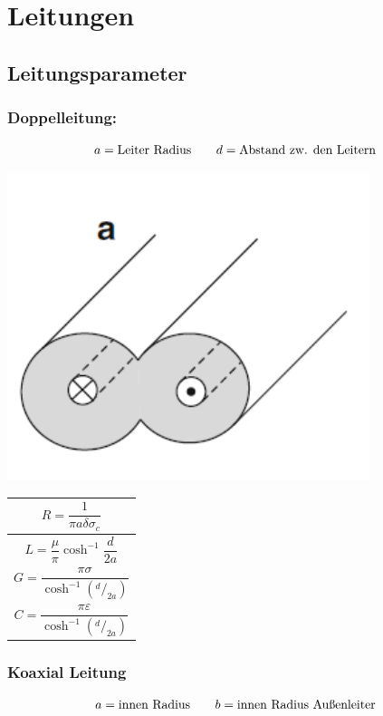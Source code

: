 \section{Leitungen}

\subsection{Leitungsparameter}

\subsubsection{Doppelleitung:}
\[
    a = \text{Leiter Radius} \qquad d = \text{Abstand zw. den Leitern} \\
\]

\includegraphics[width=0.4\columnwidth]{Figures/Doppelleitung.png}
{\renewcommand*{\arraystretch}{0.2}
    \begin{tabularx}{0.5\columnwidth}{|X|}
        \hline
        \[R  = \frac{1}{\pi a\delta\sigma_c}\]              \\
        \hline
        \[L = \frac{\mu}{\pi} \cosh^{-1}\frac{d}{2a}\]      \\
        \hline
        \[G = \frac{\pi\sigma}{\cosh^{-1}(^d/_{2a})}\]      \\
        \hline
        \[C = \frac{\pi\varepsilon}{\cosh^{-1}(^d/_{2a})}\] \\
        \hline
    \end{tabularx}}

\subsubsection{Koaxial Leitung}
\[
    a = \text{innen Radius} \qquad b = \text{innen Radius Außenleiter} \\
\]


